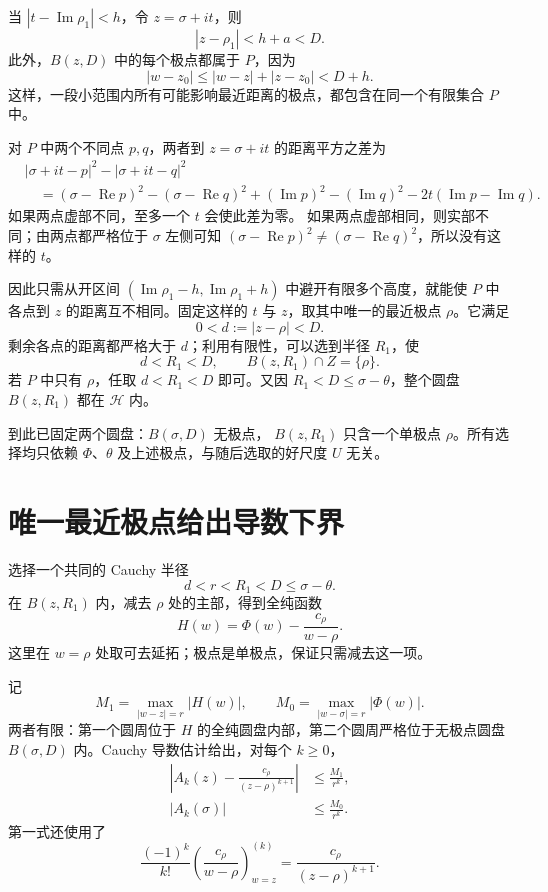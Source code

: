当 $|t-\operatorname{Im}\rho_1|<h$，令 $z=\sigma+it$，则
\[
 |z-\rho_1|<h+a<D.
\]
此外，$B(z,D)$ 中的每个极点都属于 $P$，因为
\[
 |w-z_0|\le |w-z|+|z-z_0|<D+h.
\]
这样，一段小范围内所有可能影响最近距离的极点，都包含在同一个有限集合 $P$ 中。

对 $P$ 中两个不同点 $p,q$，两者到 $z=\sigma+it$ 的距离平方之差为
\begin{align*}
 &|\sigma+it-p|^2-|\sigma+it-q|^2\\
 &\quad=(\sigma-\operatorname{Re}p)^2
       -(\sigma-\operatorname{Re}q)^2
       +(\operatorname{Im}p)^2-(\operatorname{Im}q)^2
       -2t(\operatorname{Im}p-\operatorname{Im}q).
\end{align*}
如果两点虚部不同，至多一个 $t$ 会使此差为零。
如果两点虚部相同，则实部不同；由两点都严格位于 $\sigma$ 左侧可知
$(\sigma-\operatorname{Re}p)^2\ne
(\sigma-\operatorname{Re}q)^2$，所以没有这样的 $t$。

因此只需从开区间
$(\operatorname{Im}\rho_1-h,\operatorname{Im}\rho_1+h)$
中避开有限多个高度，就能使 $P$ 中各点到 $z$ 的距离互不相同。固定这样的 $t$ 与 $z$，取其中唯一的最近极点 $\rho$。它满足
\[
 0<d:=|z-\rho|<D.
\]
剩余各点的距离都严格大于 $d$；利用有限性，可以选到半径 $R_1$，使
\begin{equation}
 d<R_1<D,\qquad B(z,R_1)\cap Z=\{\rho\}.
 \label{eq:win-isolated-disc}
\end{equation}
若 $P$ 中只有 $\rho$，任取 $d<R_1<D$ 即可。又因
$R_1<D\le\sigma-\theta$，整个圆盘 $B(z,R_1)$ 都在 $\mathcal H$ 内。

到此已固定两个圆盘：$B(\sigma,D)$ 无极点，
$B(z,R_1)$ 只含一个单极点 $\rho$。所有选择均只依赖 $\Phi$、$\theta$ 及上述极点，与随后选取的好尺度 $U$ 无关。

\section{唯一最近极点给出导数下界}

选择一个共同的 Cauchy 半径
\begin{equation}
 d<r<R_1<D\le\sigma-\theta.
 \label{eq:win-cauchy-radius}
\end{equation}
在 $B(z,R_1)$ 内，减去 $\rho$ 处的主部，得到全纯函数
\[
 H(w)=\Phi(w)-\frac{c_\rho}{w-\rho}.
\]
这里在 $w=\rho$ 处取可去延拓；极点是单极点，保证只需减去这一项。

记
\[
 M_1=\max_{|w-z|=r}|H(w)|,\qquad
 M_0=\max_{|w-\sigma|=r}|\Phi(w)|.
\]
两者有限：第一个圆周位于 $H$ 的全纯圆盘内部，第二个圆周严格位于无极点圆盘 $B(\sigma,D)$ 内。Cauchy 导数估计给出，对每个 $k\ge0$，
\begin{align}
 \left|A_k(z)-\frac{c_\rho}{(z-\rho)^{k+1}}\right|
       &\le\frac{M_1}{r^k},\label{eq:win-pole-cauchy}\\
 |A_k(\sigma)|&\le\frac{M_0}{r^k}.
 \label{eq:win-free-cauchy}
\end{align}
第一式还使用了
\[
 \frac{(-1)^k}{k!}
 \left(\frac{c_\rho}{w-\rho}\right)^{(k)}_{\!w=z}
   =\frac{c_\rho}{(z-\rho)^{k+1}}.
\]

